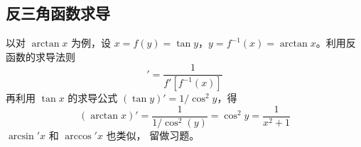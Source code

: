 \subsection{反三角函数求导}
以对 $\arctan x$ 为例，设 $x=f(y)=\tan y$，$y=f^{-1}(x)=\arctan x$。利用反函数的求导法则
\begin{equation}
[f^{-1} (x)]' = \frac{1}{f'[f^{ - 1}(x)]}
\end{equation} 
再利用 $\tan x$ 的求导公式 $(\tan y)'=1/\cos^2 y$，得
\begin{equation}
(\arctan x)'=\frac{1}{1/\cos^2 (y)}=\cos^2 y=\frac{1}{x^2+1}
\end{equation}
$\arcsin' x$ 和 $\arccos' x$ 也类似， 留做习题。
